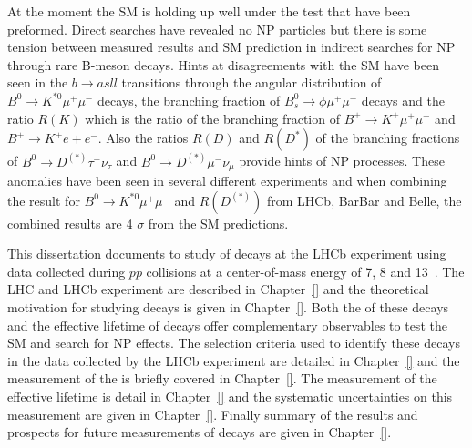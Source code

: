 At the moment the SM is holding up well under the test that have been preformed. Direct searches have revealed no NP particles but there is some tension between measured results and SM prediction in indirect searches for NP through rare B-meson decays. Hints at disagreements with the SM have been seen in the $b \to a sll$ transitions through the angular distribution of $B^0 \to K^{*0} \mu^{+} \mu^{-}$ decays, the branching fraction of $B^{0}_{s} \to \phi  \mu^{+} \mu^{-}$ decays and the ratio $R(K)$ which is the ratio of the branching fraction of $B^+ \to K^+ \mu^{+} \mu^{-}$ and $B^+ \to K^+ e{+} e^{-}$. Also the ratios $R(D)$ and $R(D^*)$ of the branching fractions of $B^0 \to D^{(*)} \tau^{-} \nu_{\tau}$ and $B^0 \to D^{(*)} \mu^{-} \nu_{\mu}$ provide hints of NP processes. These anomalies have been seen in several different experiments and when combining the result for $B^0 \to K^{*0} \mu^{+} \mu^{-}$ and $R(D^{(*)})$ from LHCb, BarBar and Belle, the combined results are 4 $\sigma$ from the SM predictions.


This dissertation documents to study of \bmumu decays at the LHCb experiment using data collected during $pp$ collisions at a center-of-mass energy of 7, 8 and 13~\tev. The LHC and LHCb experiment are described in Chapter~\ref{} and the theoretical motivation for studying \bmumu decays is given in Chapter~\ref{}. Both the \BF of these decays and the effective lifetime of \bsmumu decays offer complementary observables to test the SM and search for NP effects. The selection criteria used to identify these decays in the data collected by the LHCb experiment are detailed in Chapter~\ref{} and the measurement of the \BF is briefly covered in Chapter~\ref{}. The measurement of the effective lifetime is detail in Chapter~\ref{} and the systematic uncertainties on this measurement are given in Chapter~\ref{}. Finally summary of the results and prospects for future measurements of \bmumu decays are given in Chapter~\ref{}.


